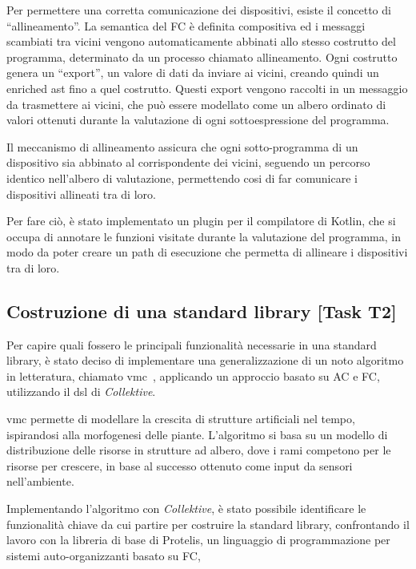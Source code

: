 \documentclass[13pt, a4paper]{article}
\newcommand{\ck}{\emph{Collektive}}
\begin{document}
Per permettere una corretta comunicazione dei dispositivi, esiste il concetto di ``allineamento''.
%
La semantica del \ac{FC} è definita compositiva ed i messaggi scambiati tra vicini vengono automaticamente abbinati
    allo stesso costrutto del programma, determinato da un processo chiamato allineamento.
%
Ogni costrutto genera un ``export'', un valore di dati da inviare ai vicini, creando quindi un enriched \ac{ast} fino a quel costrutto.
%
Questi export vengono raccolti in un messaggio da trasmettere ai vicini, che può essere modellato come
    un albero ordinato di valori ottenuti durante la valutazione di ogni sottoespressione del programma.

Il meccanismo di allineamento assicura che ogni sotto-programma di un dispositivo sia abbinato al corrispondente dei vicini,
    seguendo un percorso identico nell'albero di valutazione,
    permettendo cosi di far comunicare i dispositivi allineati tra di loro.

Per fare ciò, è stato implementato un plugin per il compilatore di Kotlin, che si occupa di annotare le funzioni visitate
    durante la valutazione del programma, in modo da poter creare un path di esecuzione che permetta di allineare i dispositivi
    tra di loro.

\subsection{Costruzione di una standard library [Task T2]}\label{subsec:task-t2-[costruzione-di-una-standard-library]}

Per capire quali fossero le principali funzionalità necessarie in una standard library,
è stato deciso di implementare una generalizzazione di un noto algoritmo in letteratura, chiamato \ac{vmc}~\cite{ZahadatHS17},
applicando un approccio basato su \ac{AC} e \ac{FC}, utilizzando il \ac{dsl} di \ck{}.

\ac{vmc} permette di modellare la crescita di strutture artificiali nel tempo, ispirandosi alla morfogenesi delle piante.
%
L'algoritmo si basa su un modello di distribuzione delle risorse in strutture ad albero,
    dove i rami competono per le risorse per crescere, in base al successo ottenuto come input da sensori nell'ambiente.

Implementando l'algoritmo con \ck{}, è stato possibile identificare le funzionalità chiave da cui partire per costruire la standard library,
    confrontando il lavoro con la libreria di base di Protelis,
    un linguaggio di programmazione per sistemi auto-organizzanti basato su \ac{FC},
\end{document}
